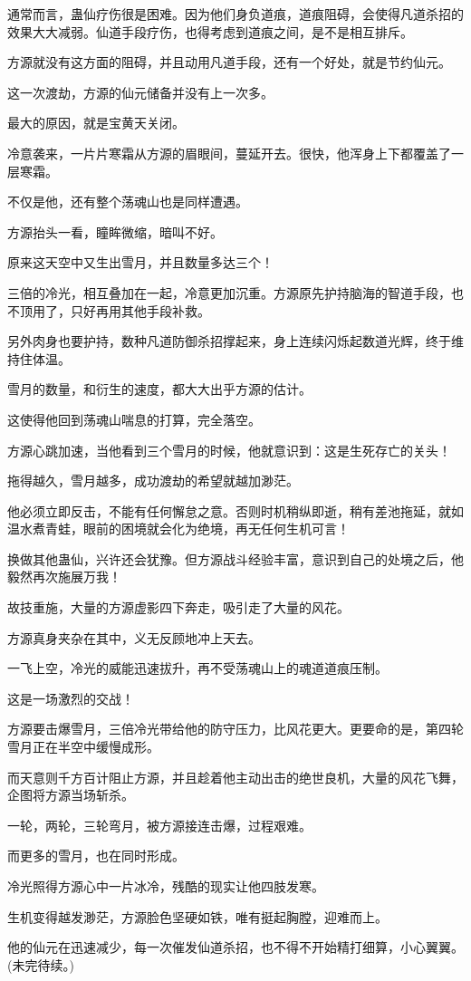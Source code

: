\begin{this_body}
通常而言，蛊仙疗伤很是困难。因为他们身负道痕，道痕阻碍，会使得凡道杀招的效果大大减弱。仙道手段疗伤，也得考虑到道痕之间，是不是相互排斥。

方源就没有这方面的阻碍，并且动用凡道手段，还有一个好处，就是节约仙元。

这一次渡劫，方源的仙元储备并没有上一次多。

最大的原因，就是宝黄天关闭。

冷意袭来，一片片寒霜从方源的眉眼间，蔓延开去。很快，他浑身上下都覆盖了一层寒霜。

不仅是他，还有整个荡魂山也是同样遭遇。

方源抬头一看，瞳眸微缩，暗叫不好。

原来这天空中又生出雪月，并且数量多达三个！

三倍的冷光，相互叠加在一起，冷意更加沉重。方源原先护持脑海的智道手段，也不顶用了，只好再用其他手段补救。

另外肉身也要护持，数种凡道防御杀招撑起来，身上连续闪烁起数道光辉，终于维持住体温。

雪月的数量，和衍生的速度，都大大出乎方源的估计。

这使得他回到荡魂山喘息的打算，完全落空。

方源心跳加速，当他看到三个雪月的时候，他就意识到：这是生死存亡的关头！

拖得越久，雪月越多，成功渡劫的希望就越加渺茫。

他必须立即反击，不能有任何懈怠之意。否则时机稍纵即逝，稍有差池拖延，就如温水煮青蛙，眼前的困境就会化为绝境，再无任何生机可言！

换做其他蛊仙，兴许还会犹豫。但方源战斗经验丰富，意识到自己的处境之后，他毅然再次施展万我！

故技重施，大量的方源虚影四下奔走，吸引走了大量的风花。

方源真身夹杂在其中，义无反顾地冲上天去。

一飞上空，冷光的威能迅速拔升，再不受荡魂山上的魂道道痕压制。

这是一场激烈的交战！

方源要击爆雪月，三倍冷光带给他的防守压力，比风花更大。更要命的是，第四轮雪月正在半空中缓慢成形。

而天意则千方百计阻止方源，并且趁着他主动出击的绝世良机，大量的风花飞舞，企图将方源当场斩杀。

一轮，两轮，三轮弯月，被方源接连击爆，过程艰难。

而更多的雪月，也在同时形成。

冷光照得方源心中一片冰冷，残酷的现实让他四肢发寒。

生机变得越发渺茫，方源脸色坚硬如铁，唯有挺起胸膛，迎难而上。

他的仙元在迅速减少，每一次催发仙道杀招，也不得不开始精打细算，小心翼翼。(未完待续。)

\end{this_body}

